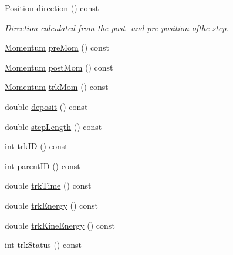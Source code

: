 \begin{DoxyCompactItemize}
\hyperlink{namespace_d_d4hep_1_1_simulation_ad6fd94b3439e31d1ba4b2e640d578558}{Position} \hyperlink{class_d_d4hep_1_1_simulation_1_1_geant4_step_handler_aa44b96c9905fb7da6a8a8dd95b39abea}{direction} () const 
\begin{DoxyCompactList}\small\item\em Direction calculated from the post-\/ and pre-\/position ofthe step. \item\end{DoxyCompactList}\item 
\hyperlink{namespace_d_d4hep_1_1_simulation_aead01eb580dc503a5abba194d179c963}{Momentum} \hyperlink{class_d_d4hep_1_1_simulation_1_1_geant4_step_handler_a3262383310d646a583768f7b408a2d94}{preMom} () const 
\item 
\hyperlink{namespace_d_d4hep_1_1_simulation_aead01eb580dc503a5abba194d179c963}{Momentum} \hyperlink{class_d_d4hep_1_1_simulation_1_1_geant4_step_handler_a20327303625dbb2ae209885d2b098564}{postMom} () const 
\item 
\hyperlink{namespace_d_d4hep_1_1_simulation_aead01eb580dc503a5abba194d179c963}{Momentum} \hyperlink{class_d_d4hep_1_1_simulation_1_1_geant4_step_handler_ae7c77f7a22ebb78200c03e5efaa6e18c}{trkMom} () const 
\item 
double \hyperlink{class_d_d4hep_1_1_simulation_1_1_geant4_step_handler_a35ffa3abf0d0d88425b1e6bb0f686d97}{deposit} () const 
\item 
double \hyperlink{class_d_d4hep_1_1_simulation_1_1_geant4_step_handler_ab5ff5a25a2af70cd601dc9cf0d4c4447}{stepLength} () const 
\item 
int \hyperlink{class_d_d4hep_1_1_simulation_1_1_geant4_step_handler_a6b639a13014e835db1a7b4a1e69469d1}{trkID} () const 
\item 
int \hyperlink{class_d_d4hep_1_1_simulation_1_1_geant4_step_handler_a3c5bcd136c18f2269c58e81f36e97eae}{parentID} () const 
\item 
double \hyperlink{class_d_d4hep_1_1_simulation_1_1_geant4_step_handler_a1962e84c22f2078e94e634fd7244172c}{trkTime} () const 
\item 
double \hyperlink{class_d_d4hep_1_1_simulation_1_1_geant4_step_handler_a959289c814f1eb86b0ab9968f6fd84c5}{trkEnergy} () const 
\item 
double \hyperlink{class_d_d4hep_1_1_simulation_1_1_geant4_step_handler_afd5bdb880e61a61270f3fb84d606a5d9}{trkKineEnergy} () const 
\item 
int \hyperlink{class_d_d4hep_1_1_simulation_1_1_geant4_step_handler_aba809cb57c873101356094271008c068}{trkStatus} () const 

\end{DoxyCompactItemize}
